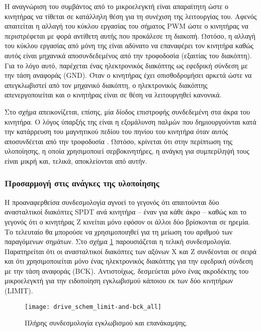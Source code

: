Η αναγνώριση του συμβάντος από το μικροελεγκτή είναι απαραίτητη ώστε ο κινητήρας
να τίθεται σε κατάλληλη θέση για τη συνέχιση της λειτουργίας του. Αφενός
απαιτείται η αλλαγή του κύκλου εργασίας του σήματος PWM ώστε ο κινητήρας να
περιστρέφεται με φορά αντίθετη αυτής που προκάλεσε τη διακοπή. Ωστόσο, η αλλαγή
του κύκλου εργασίας από μόνη της είναι αδύνατο να επαναφέρει τον κινητήρα καθώς
αυτός είναι μηχανικά αποσυνδεδεμένος από την τροφοδοσία (εξαιτίας του διακόπτη).
Για το λόγο αυτό, παρέχεται ένας ηλεκτρονικός διακόπτης ως εφεδρική σύνδεση με
την τάση αναφοράς (GND). Όταν ο κινητήρας έχει οπισθοδρομήσει αρκετά ώστε να
απεγκλωβιστεί από τον μηχανικό διακόπτη, ο ηλεκτρονικός διακόπτης
απενεργοποιείται και ο κινητήρας είναι σε θέση να λειτουργηθεί κανονικά.

Στο σχήμα απεικονίζεται, επίσης, μία δίοδος επιστροφής συνδεδεμένη στα άκρα του
κινητήρα. Ο λόγος ύπαρξής της είναι η εξομάλυνση παλμών που δημιουργούνται κατά
την κατάρρευση του μαγνητικού πεδίου του πηνίου του κινητήρα όταν αυτός
αποσυνδέεται από την τροφοδοσία \parencite[130--132]{kuphaldt09semi}. Ωστόσο,
κρίνεται ότι στην περίπτωση της υλοποίησης, η οποία χρησιμοποιεί σερβοκινητήρες,
η ανάγκη για συμπερίληψή τους είναι μικρή και, τελικά, αποκλείονται από αυτήν.

\subsubsection{Προσαρμογή στις ανάγκες της υλοποίησης}

Η προαναφερθείσα συνδεσμολογία αγνοεί το γεγονός ότι απαιτούνται δύο
ανασταλτικοί διακόπτες SPDT ανά κινητήρα -- έναν για κάθε άκρο -- καθώς και το
γεγονός ότι ο κινητήρας Z κινείται μόνο εφόσον οι άλλοι δύο βρίσκονται σε
ηρεμία. Το τελευταίο θα μπορούσε να χρησιμοποιηθεί για τη μείωση του αριθμού των
παραγόμενων σημάτων. Στο σχήμα \ref{fig:motor:limit_switch_final} παρουσιάζεται
η τελική συνδεσμολογία. Παρατηρείται ότι οι ανασταλτικοί διακόπτες των αξόνων X
και Z συνδέονται σε σειρά και ότι χρησιμοποιείται μόνο ένας ηλεκτρονικός
διακόπτης για την εφεδρική σύνδεση με την τάση αναφοράς (BCK).
Αντιστοίχως, δεσμεύεται μόνο ένας ακροδέκτης του μικροελεγκτή για την ειδοποίηση
εγκλωβισμού κάποιου εκ των δύο κινητήρων (LIMIT).

\begin{figure}
    \caption{Πλήρης συνδεσμολογία εγκλωβισμού και επανάκαμψης.
    \label{fig:motor:limit_switch_final}}
    \begin{center}
    \texttt{[image: drive\_schem\_limit-and-bck\_all]}
    \end{center}
\end{figure}

